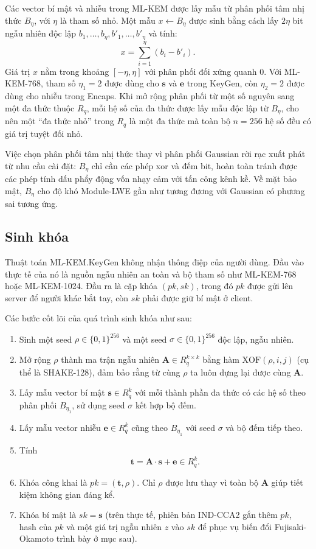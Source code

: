 Các vector bí mật và nhiễu trong ML-KEM được lấy mẫu từ phân phối tâm nhị thức $B_\eta$, với $\eta$ là tham số nhỏ. Một mẫu $x \leftarrow B_\eta$ được sinh bằng cách lấy $2\eta$ bit ngẫu nhiên độc lập $b_1, \ldots, b_\eta, b'_1, \ldots, b'_\eta$ và tính:
\[
x = \sum_{i=1}^{\eta} (b_i - b'_i).
\]
Giá trị $x$ nằm trong khoảng $[-\eta, \eta]$ với phân phối đối xứng quanh $0$. Với ML-KEM-768, tham số $\eta_1 = 2$ được dùng cho $\mathbf{s}$ và $\mathbf{e}$ trong KeyGen, còn $\eta_2 = 2$ được dùng cho nhiễu trong Encaps. Khi mở rộng phân phối từ một số nguyên sang một đa thức thuộc $R_q$, mỗi hệ số của đa thức được lấy mẫu độc lập từ $B_\eta$, cho nên một ``đa thức nhỏ'' trong $R_q$ là một đa thức mà toàn bộ $n = 256$ hệ số đều có giá trị tuyệt đối nhỏ.

Việc chọn phân phối tâm nhị thức thay vì phân phối Gaussian rời rạc xuất phát từ nhu cầu cài đặt: $B_\eta$ chỉ cần các phép xor và đếm bit, hoàn toàn tránh được các phép tính dấu phẩy động vốn nhạy cảm với tấn công kênh kề. Về mặt bảo mật, $B_\eta$ cho độ khó Module-LWE gần như tương đương với Gaussian có phương sai tương ứng.

\subsection{Sinh khóa}

Thuật toán ML-KEM.KeyGen không nhận thông điệp của người dùng. Đầu vào thực tế của nó là nguồn ngẫu nhiên an toàn và bộ tham số như ML-KEM-768 hoặc ML-KEM-1024. Đầu ra là cặp khóa $(pk, sk)$, trong đó $pk$ được gửi lên server để người khác bắt tay, còn $sk$ phải được giữ bí mật ở client.

Các bước cốt lõi của quá trình sinh khóa như sau:

\begin{enumerate}
    \item Sinh một seed $\rho \in \{0,1\}^{256}$ và một seed $\sigma \in \{0,1\}^{256}$ độc lập, ngẫu nhiên.
    \item Mở rộng $\rho$ thành ma trận ngẫu nhiên $\mathbf{A} \in R_q^{k \times k}$ bằng hàm $\text{XOF}(\rho, i, j)$ (cụ thể là SHAKE-128), đảm bảo rằng từ cùng $\rho$ ta luôn dựng lại được cùng $\mathbf{A}$.
    \item Lấy mẫu vector bí mật $\mathbf{s} \in R_q^k$ với mỗi thành phần đa thức có các hệ số theo phân phối $B_{\eta_1}$, sử dụng seed $\sigma$ kết hợp bộ đếm.
    \item Lấy mẫu vector nhiễu $\mathbf{e} \in R_q^k$ cũng theo $B_{\eta_1}$ với seed $\sigma$ và bộ đếm tiếp theo.
    \item Tính
    \[
    \mathbf{t} = \mathbf{A} \cdot \mathbf{s} + \mathbf{e} \in R_q^k.
    \]
    \item Khóa công khai là $pk = (\mathbf{t}, \rho)$. Chỉ $\rho$ được lưu thay vì toàn bộ $\mathbf{A}$ giúp tiết kiệm không gian đáng kể.
    \item Khóa bí mật là $sk = \mathbf{s}$ (trên thực tế, phiên bản IND-CCA2 gắn thêm $pk$, hash của $pk$ và một giá trị ngẫu nhiên $z$ vào $sk$ để phục vụ biến đổi Fujisaki-Okamoto trình bày ở mục sau).
\end{enumerate}


